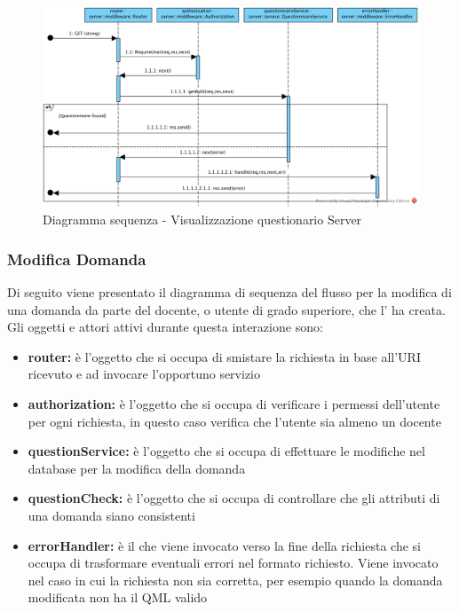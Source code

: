 \documentclass[12pt,a4paper]{article}
\begin{document}
\begin{center}
	\begin{figure}[H]
		\centering \includegraphics[max width=\myheight, angle=90]{../img/diagrammiSequenza/getQuestionnareDaEseguireServer.png}
		\caption{Diagramma sequenza - Visualizzazione questionario Server}
	\end{figure}
\end{center}

\newpage
\subsubsection{Modifica Domanda}
Di seguito viene presentato il diagramma di sequenza del flusso per la modifica di una domanda da parte del docente, o utente di grado superiore, che l' ha creata. Gli oggetti e attori attivi durante questa interazione sono:

\begin{itemize}
	\item \textbf{router:} è l'oggetto che si occupa di smistare la richiesta in base all’URI ricevuto e ad invocare l’opportuno servizio
	\item \textbf{authorization:} è l'oggetto che si occupa di verificare i permessi dell'utente per ogni richiesta, in questo caso verifica che l'utente sia almeno un docente
	\item \textbf{questionService:} è l'oggetto che si occupa di effettuare le modifiche nel database per la modifica della domanda
	\item \textbf{questionCheck:} è l'oggetto che si occupa di controllare che gli attributi di una domanda siano consistenti
	\item \textbf{errorHandler:} è il  che viene invocato verso la fine della richiesta che si occupa di trasformare eventuali errori nel formato  richiesto. Viene invocato nel caso in cui la richiesta non sia corretta, per esempio quando la domanda modificata non ha il QML valido
\end{itemize}
\end{document}
